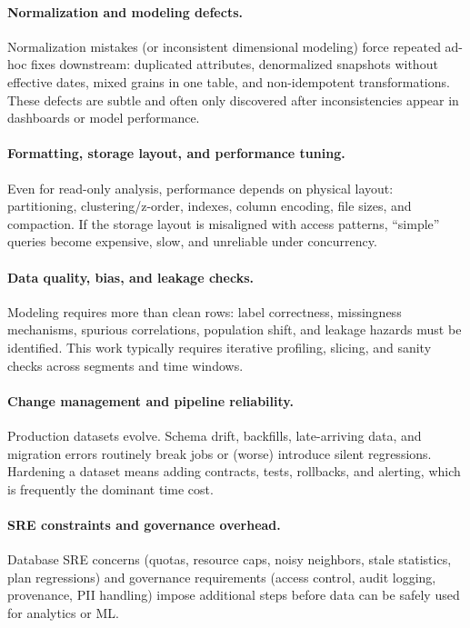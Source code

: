 \documentclass{article} %
\begin{document}
\paragraph{Normalization and modeling defects.}
Normalization mistakes (or inconsistent dimensional modeling) force repeated ad-hoc fixes downstream:
duplicated attributes, denormalized snapshots without effective dates, mixed grains in one table, and
non-idempotent transformations. These defects are subtle and often only discovered after inconsistencies
appear in dashboards or model performance.

\paragraph{Formatting, storage layout, and performance tuning.}
Even for read-only analysis, performance depends on physical layout: partitioning, clustering/z-order,
indexes, column encoding, file sizes, and compaction. If the storage layout is misaligned with access
patterns, ``simple'' queries become expensive, slow, and unreliable under concurrency.

\paragraph{Data quality, bias, and leakage checks.}
Modeling requires more than clean rows: label correctness, missingness mechanisms, spurious correlations,
population shift, and leakage hazards must be identified. This work typically requires iterative
profiling, slicing, and sanity checks across segments and time windows.

\paragraph{Change management and pipeline reliability.}
Production datasets evolve. Schema drift, backfills, late-arriving data, and migration errors routinely
break jobs or (worse) introduce silent regressions. Hardening a dataset means adding contracts, tests,
rollbacks, and alerting, which is frequently the dominant time cost.

\paragraph{SRE constraints and governance overhead.}
Database SRE concerns (quotas, resource caps, noisy neighbors, stale statistics, plan regressions) and
governance requirements (access control, audit logging, provenance, PII handling) impose additional
steps before data can be safely used for analytics or ML.
\end{document}
